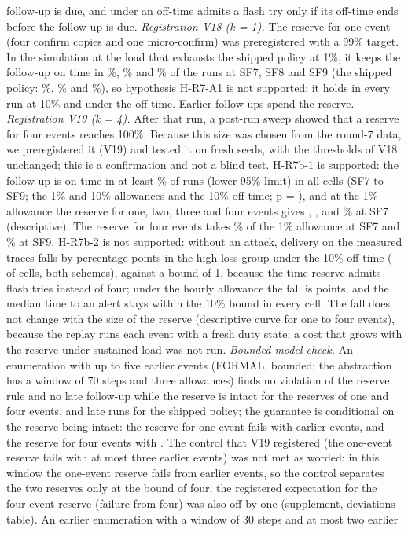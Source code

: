 \documentclass{ieeeaccess}
\begin{document}
follow-up is due, and under an off-time admits a flash try only if its off-time ends before the follow-up is due. \emph{Registration V18 (k = 1).} The reserve for one event (four confirm copies and one micro-confirm) was preregistered with a 99\% target. In the simulation at the load that exhausts the shipped policy at 1\%, it keeps the follow-up on time in \RsevAoneRateOneResSfSeven\%, \RsevAoneRateOneResSfEight\% and \RsevAoneRateOneResSfNine\% of the runs at SF7, SF8 and SF9 (the shipped policy: \RsevAoneRateOneOldSfSeven\%, \RsevAoneRateOneOldSfEight\% and \RsevAoneRateOneOldSfNine\%), so hypothesis H-R7-A1 is not supported; it holds in every run at 10\% and under the off-time. Earlier follow-ups spend the reserve. \emph{Registration V19 (k = 4).} After that run, a post-run sweep showed that a reserve for four events reaches 100\%. Because this size was chosen from the round-7 data, we preregistered it (V19) and tested it on fresh seeds, with the thresholds of V18 unchanged; this is a confirmation and not a blind test. H-R7b-1 is supported: the follow-up is on time in at least \RsevbWorstLower\% of runs (lower 95\% limit) in all \RsevbCellsFeasible{} cells (SF7 to SF9; the 1\% and 10\% allowances and the 10\% off-time; p = \RsevbPOne{}), and at the 1\% allowance the reserve for one, two, three and four events gives \RsevbOneRateSfSeven, \RsevbTwoRateSfSeven, \RsevbThreeRateSfSeven and \RsevbFourRateSfSeven\% at SF7 (descriptive). The reserve for four events takes \RsevReserveFourShareSfSeven\% of the 1\% allowance at SF7 and \RsevReserveFourShareSfNine\% at SF9. H-R7b-2 is not supported: without an attack, delivery on the measured traces falls by \RsevbBenignHTenDelta{} percentage points in the high-loss group under the 10\% off-time (\RsevbBenignFailCells{} of \RsevbBenignCells{} cells, both schemes), against a bound of 1, because the time reserve admits \RsevTtenFlashTriesSfSeven{} flash tries instead of four; under the hourly allowance the fall is \RsevbBenignHHourDelta{} points, and the median time to an alert stays within the 10\% bound in every cell. The fall does not change with the size of the reserve (descriptive curve for one to four events), because the replay runs each event with a fresh duty state; a cost that grows with the reserve under sustained load was not run. \emph{Bounded model check.} An enumeration with up to five earlier events (FORMAL, bounded; the abstraction has a window of 70 steps and three allowances) finds no violation of the reserve rule and no late follow-up while the reserve is intact for the reserves of one and four events, and \RsevbFormOldCond{} late runs for the shipped policy; the guarantee is conditional on the reserve being intact: the reserve for one event fails with \RsevbFormMOneFirst{} earlier events, and the reserve for four events with \RsevbFormMFourFirst{}. The control that V19 registered (the one-event reserve fails with at most three earlier events) was not met as worded: in this window the one-event reserve fails from \RsevbFormMOneFirst{} earlier events, so the control separates the two reserves only at the bound of four; the registered expectation for the four-event reserve (failure from four) was also off by one (supplement, deviations table). An earlier enumeration with a window of 30 steps and at most two earlier 
\end{document}
